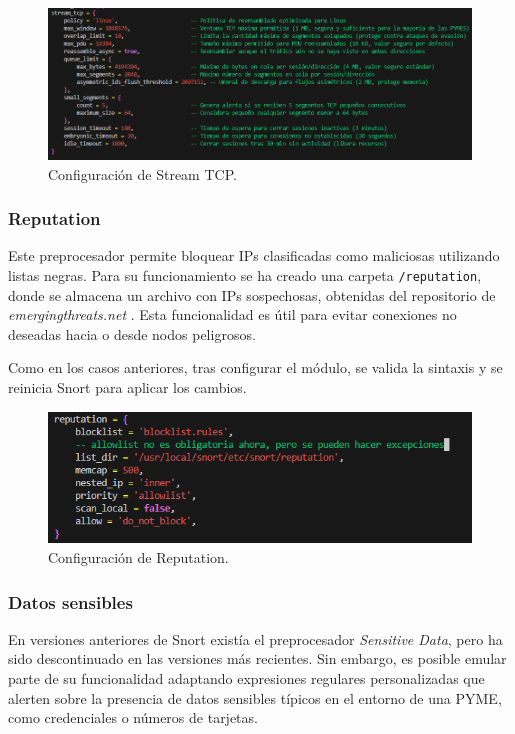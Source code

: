 \documentclass[11pt,a4paper,twoside]{report}
\begin{document}
\begin{figure}[H]
	\centering
	\includegraphics[scale=0.6]{stream_tcp/1.png}
	\caption{Configuración de Stream TCP.}
\end{figure}

\subsubsection*{Reputation}

Este preprocesador permite bloquear IPs clasificadas como maliciosas utilizando listas negras. Para su funcionamiento se ha creado una carpeta \texttt{/reputation}, donde se almacena un archivo con IPs sospechosas, obtenidas del repositorio de \textit{emergingthreats.net} \cite{emerging_block_ips}.  Esta funcionalidad es útil para evitar conexiones no deseadas hacia o desde nodos peligrosos.\newline

Como en los casos anteriores, tras configurar el módulo, se valida la sintaxis y se reinicia Snort para aplicar los cambios.

\begin{figure}[H]
	\centering
	\includegraphics[scale=0.8]{reputation/1.png}
	\caption{Configuración de Reputation.}
\end{figure}

\newpage

\subsubsection*{Datos sensibles}

En versiones anteriores de Snort existía el preprocesador \textit{Sensitive Data}, pero ha sido descontinuado en las versiones más recientes. Sin embargo, es posible emular parte de su funcionalidad adaptando expresiones regulares personalizadas que alerten sobre la presencia de datos sensibles típicos en el entorno de una PYME, como credenciales o números de tarjetas.\newline
\end{document}
